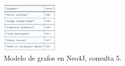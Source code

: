 \begin{figure}[H]
\centering
\includegraphics[width=0.25\textwidth]{fotos/q5_neo.png}
\caption{Modelo de grafos en Neo4J, consulta 5.}
\label{fig:q5_neo}
\end{figure}